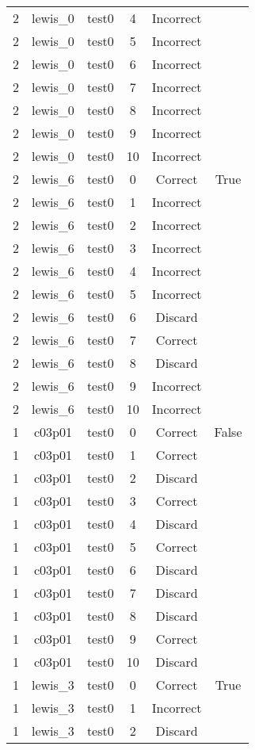 \begin{longtable}{|c|c|c|c|c|c|}
2 & lewis\_0 & test0 & 4 & Incorrect &  \\ 
2 & lewis\_0 & test0 & 5 & Incorrect &  \\ 
2 & lewis\_0 & test0 & 6 & Incorrect &  \\ 
2 & lewis\_0 & test0 & 7 & Incorrect &  \\ 
2 & lewis\_0 & test0 & 8 & Incorrect &  \\ 
2 & lewis\_0 & test0 & 9 & Incorrect &  \\ 
2 & lewis\_0 & test0 & 10 & Incorrect &  \\ 
2 & lewis\_6 & test0 & 0 & Correct & True \\ 
2 & lewis\_6 & test0 & 1 & Incorrect &  \\ 
2 & lewis\_6 & test0 & 2 & Incorrect &  \\ 
2 & lewis\_6 & test0 & 3 & Incorrect &  \\ 
2 & lewis\_6 & test0 & 4 & Incorrect &  \\ 
2 & lewis\_6 & test0 & 5 & Incorrect &  \\ 
2 & lewis\_6 & test0 & 6 & Discard &  \\ 
2 & lewis\_6 & test0 & 7 & Correct &  \\ 
2 & lewis\_6 & test0 & 8 & Discard &  \\ 
2 & lewis\_6 & test0 & 9 & Incorrect &  \\ 
2 & lewis\_6 & test0 & 10 & Incorrect &  \\ 
1 & c03p01 & test0 & 0 & Correct & False \\ 
1 & c03p01 & test0 & 1 & Correct &  \\ 
1 & c03p01 & test0 & 2 & Discard &  \\ 
1 & c03p01 & test0 & 3 & Correct &  \\ 
1 & c03p01 & test0 & 4 & Discard &  \\ 
1 & c03p01 & test0 & 5 & Correct &  \\ 
1 & c03p01 & test0 & 6 & Discard &  \\ 
1 & c03p01 & test0 & 7 & Discard &  \\ 
1 & c03p01 & test0 & 8 & Discard &  \\ 
1 & c03p01 & test0 & 9 & Correct &  \\ 
1 & c03p01 & test0 & 10 & Discard &  \\ 
1 & lewis\_3 & test0 & 0 & Correct & True \\ 
1 & lewis\_3 & test0 & 1 & Incorrect &  \\ 
1 & lewis\_3 & test0 & 2 & Discard &  \\ 

\end{longtable}
